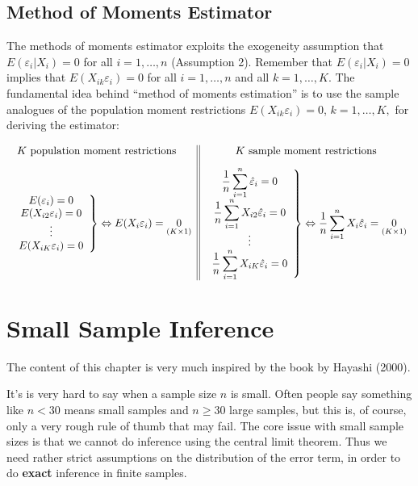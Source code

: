 \documentclass[
  letterpaper,
  DIV=11,
  numbers=noendperiod]{scrreprt}
\theoremstyle{definition}
\theoremstyle{plain}
\theoremstyle{plain}
\theoremstyle{remark}
\begin{document}
\hypertarget{method-of-moments-estimator}{%
\section{Method of Moments
Estimator}\label{method-of-moments-estimator}}

The methods of moments estimator exploits the exogeneity assumption that
\(E(\varepsilon_i|X_i)=0\) for all \(i=1,\dots,n\) (Assumption 2).
Remember that \(E(\varepsilon_i|X_i)=0\) implies that
\(E(X_{ik}\varepsilon_i)=0\) for all \(i=1,\dots,n\) and all
\(k=1,\dots,K\). The fundamental idea behind ``method of moments
estimation'' is to use the sample analogues of the population moment
restrictions \(E(X_{ik}\varepsilon_i)=0\), \(k=1,\dots,K,\) for deriving
the estimator:

\[
\begin{array}{c||c}
\text{$K$ population moment restrictions\quad}&\text{$K$ sample moment restrictions}\\[2ex]
\left.\begin{array}{c}
E(\varepsilon_i)=0\\
E(X_{i2}\varepsilon_i)=0\\
\vdots\\
E(X_{iK}\varepsilon_i)=0
\end{array}
\right\}\Leftrightarrow E(X_i\varepsilon_i)=\underset{(K\times 1)}{0} &
\left.\begin{array}{c}
\displaystyle
\frac{1}{n}\sum_{i=1}^n\hat\varepsilon_i=0\\
\displaystyle
\frac{1}{n}\sum_{i=1}^nX_{i2}\hat\varepsilon_i=0\\
\vdots\\
\displaystyle
\frac{1}{n}\sum_{i=1}^nX_{iK}\hat\varepsilon_i=0\\
\end{array}
\right\}\Leftrightarrow \displaystyle\frac{1}{n}\sum_{i=1}^nX_i\hat\varepsilon_i=\underset{(K\times 1)}{0}
\end{array}
\]


\hypertarget{sec-ssinf}{%
\chapter{Small Sample Inference}\label{sec-ssinf}}

The content of this chapter is very much inspired by the book by Hayashi
(2000).

It's is very hard to say when a sample size \(n\) is small. Often people
say something like \(n<30\) means small samples and \(n\geq 30\) large
samples, but this is, of course, only a very rough rule of thumb that
may fail. The core issue with small sample sizes is that we cannot do
inference using the central limit theorem. Thus we need rather strict
assumptions on the distribution of the error term, in order to do
\textbf{exact} inference in finite samples.
\end{document}
